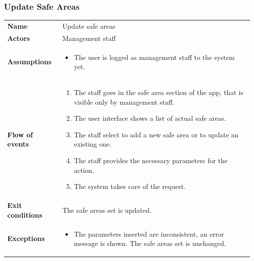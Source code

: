 \documentclass[english]{article}
\begin{document}
		\subsubsection{Update Safe Areas}
		\begin{center}
		\begin{tabular}{l||p{10cm}}
		\textbf{Name} 
			& Update safe areas\\ [8px]
		\textbf{Actors} 
			& Management staff\\ [8px]
		\textbf{Assumptions} 
			& \begin{itemize}
				\item The user is logged as management staff to the system yet.
			\end{itemize}\\
		\textbf{Flow of events}
			& \begin{enumerate}
	 			\item The staff goes in the safe area section of the app, that is visible only by management staff.
				\item The user interface shows a list of actual safe areas.
				\item The staff select to add a new safe area or to update an existing one.
				\item The staff provides the necessary parameters for the action.
				\item The system takes care of the request.
			\end{enumerate}\\ 
		\textbf{Exit conditions}
			& The safe areas set is updated.\\ [8px]
		\textbf{Exceptions}
			& \begin{itemize}
				\item The parameters inserted are inconsistent, an error message is shown. The safe areas set is unchanged.
			\end{itemize}
		\end{tabular}
		\end{center}
		\noindent
\end{document}
